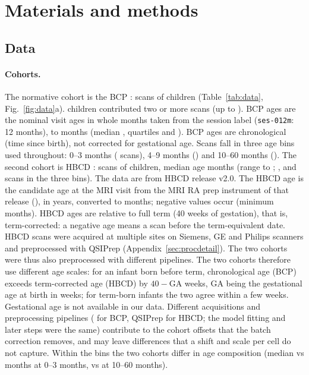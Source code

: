 \documentclass[11pt]{article}
\begin{document}
\section{Materials and methods}

\subsection{Data}\label{sec:data}

\paragraph{Cohorts.} The normative cohort is the BCP \citep{howell2019bcp}: \bcpscans{} scans of \bcpsubjects{}
children (Table~\ref{tab:data}, Fig.~\ref{fig:data}a). \bcpsubjTwoPlus{} children contributed two or more scans (up to
\bcpsessmax{}). BCP ages are the nominal visit ages in whole months taken from the session label (\texttt{ses-012m}:
12 months), \bcpagemin{} to \bcpagemax{} months (median \bcpagemedian{}, quartiles \bcpageQOne{} and \bcpageQThree{}).
BCP ages are chronological (time since birth), not corrected for gestational age. Scans fall in three
age bins used throughout: 0--3 months (\bcpbinA{} scans), 4--9 months (\bcpbinB{}) and 10--60 months (\bcpbinC{}).  The
second cohort is HBCD \citep{volkow2021hbcd,dean2024hbcdmri}: \hbcdscans{} scans of \hbcdsubjects{} children, median
age \hbcdagemedian{} months (range \hbcdagemin{} to \hbcdagemax{}; \hbcdbinA{}, \hbcdbinB{} and \hbcdbinC{} scans in
the three bins). The data are from HBCD release v2.0. The HBCD age is the candidate age at the MRI visit from the
MRI RA prep instrument of that release (), in years, converted to months; negative values
occur (minimum \hbcdagemin{} months). HBCD ages are relative to full term (40 weeks of gestation), that is,
term-corrected: a negative age means a scan before the term-equivalent date. HBCD scans were acquired at multiple sites on Siemens,
GE and Philips scanners and preprocessed with QSIPrep \citep{cieslak2025hbcd} (Appendix~\ref{sec:procdetail}). The two
cohorts were thus also preprocessed with different pipelines. The two cohorts therefore use different age scales: for an infant born before term, chronological age (BCP) exceeds
term-corrected age (HBCD) by $40-\text{GA}$ weeks, GA being the gestational age at birth in weeks; for term-born infants
the two agree within a few weeks. Gestational age is not available in our data. Different acquisitions and preprocessing pipelines ( for BCP, QSIPrep for HBCD;
the model fitting and later steps were the same) contribute to the cohort offsets that the batch correction removes, and may leave differences that a
shift and scale per cell do not capture. Within the bins the two cohorts differ in age composition (median \ageMedBcpA{} vs \ageMedHbcdA{} months
at 0--3 months, \ageMedBcpC{} vs \ageMedHbcdC{} at 10--60 months).
\end{document}
